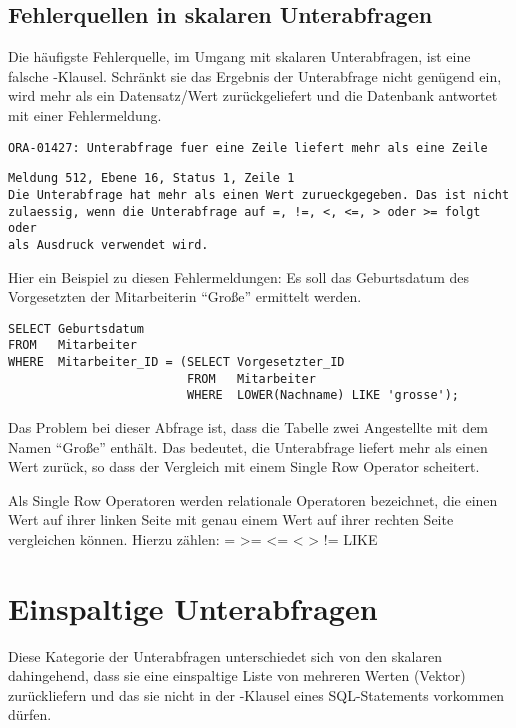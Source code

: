 \subsection{Fehlerquellen in skalaren Unterabfragen}
Die häufigste Fehlerquelle, im Umgang mit skalaren Unterabfragen, ist eine falsche \WHERE-Klausel. Schränkt sie das Ergebnis der Unterabfrage nicht genügend ein, wird mehr als ein Datensatz/Wert zurückgeliefert und die Datenbank antwortet mit einer Fehlermeldung.
\begin{lstlisting}[language=oracle_sql,caption={Mehr als eine Zeile: Fehlermeldung in Oracle},label=sql06_04]
ORA-01427: Unterabfrage fuer eine Zeile liefert mehr als eine Zeile
          \end{lstlisting}
\begin{lstlisting}[language=ms_sql,caption={Mehr als eine Zeile: Fehlermeldung in SQL Server},label=sql06_05]
Meldung 512, Ebene 16, Status 1, Zeile 1
Die Unterabfrage hat mehr als einen Wert zurueckgegeben. Das ist nicht
zulaessig, wenn die Unterabfrage auf =, !=, <, <=, > oder >= folgt oder
als Ausdruck verwendet wird.
          \end{lstlisting}
Hier ein Beispiel zu diesen Fehlermeldungen: Es soll das Geburtsdatum des Vorgesetzten der Mitarbeiterin \enquote{Große} ermittelt werden.
\begin{lstlisting}[language=oracle_sql,caption={Eine Single Row Unterabfrage mit Problemen!},label=sql06_06]
SELECT Geburtsdatum
FROM   Mitarbeiter
WHERE  Mitarbeiter_ID = (SELECT Vorgesetzter_ID
                         FROM   Mitarbeiter
                         WHERE  LOWER(Nachname) LIKE 'grosse');
          \end{lstlisting}
Das Problem bei dieser Abfrage ist, dass die Tabelle  zwei Angestellte mit dem Namen \enquote{Große} enthält. Das bedeutet, die Unterabfrage liefert mehr als einen Wert zurück, so dass der Vergleich mit einem Single Row Operator scheitert.

\begin{merke}
    Als Single Row Operatoren werden relationale Operatoren bezeichnet, die einen Wert auf ihrer linken Seite mit genau einem Wert auf ihrer rechten Seite vergleichen können. Hierzu zählen: = >= <= < > != LIKE
\end{merke}
\section{Einspaltige Unterabfragen}
Diese Kategorie der Unterabfragen unterschiedet sich von den skalaren dahingehend, dass sie eine einspaltige Liste von mehreren Werten (Vektor) zurückliefern und das sie nicht in der \SELECT-Klausel eines SQL-Statements vorkommen dürfen.
